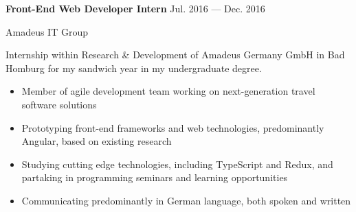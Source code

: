 \parbox[t][][t]{\linewidth}{
	\parbox{\linewidth}{{\textbf{Front-End Web Developer Intern}}
		\hfill {{Jul. 2016 --- Dec. 2016}}}
	\smallbreak
	
	\parbox{\linewidth}{Amadeus IT Group}
	
	\bigskip
	Internship within Research \& Development of Amadeus Germany GmbH in Bad Homburg for my sandwich year in my undergraduate degree.
	
	\bigskip
	\begin{itemize}
		\item{Member of agile development team working on next-generation travel software solutions}\\[-.6em]
		\item{Prototyping front-end frameworks and web technologies, predominantly Angular, based on existing research}\\[-.6em]
		\item{Studying cutting edge technologies, including TypeScript and Redux, and partaking in programming seminars and learning opportunities}\\[-.6em]
		\item{Communicating predominantly in German language, both spoken and written}\\[-.6em]
	\end{itemize}
}

